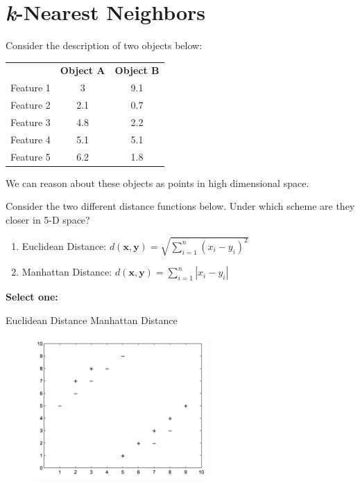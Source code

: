 \documentclass[11pt,addpoints,answers]{exam}
\numberwithin{equation}{section} %
\numberwithin{figure}{section} %
\numberwithin{table}{section} %
\newcommand{\xv}{\mathbf{x}}
\newcommand{\yv}{\mathbf{y}}
\begin{document}
\newpage
\section{{\it k}-Nearest Neighbors}


\begin{questions}
    \question[3] Consider the description of two objects below:
    
    \begin{table}[H]
        \centering
        \begin{tabular}{c c c}
             & \textbf{Object A} & \textbf{Object B} \\
            Feature 1 & 3 & 9.1 \\
            Feature 2 & 2.1 & 0.7 \\
            Feature 3 & 4.8 & 2.2 \\
            Feature 4 & 5.1 & 5.1 \\
            Feature 5 & 6.2 & 1.8 
        \end{tabular}
    \end{table}
    We can reason about these objects as points in high dimensional space.
    
    Consider the two different distance functions below. Under which scheme are they closer in 5-D space?
    \begin{enumerate}
        \item Euclidean Distance: $d(\xv, \yv) = \sqrt{\sum_{i=1}^n (x_i - y_i)^2}$
        \item Manhattan Distance: $d(\xv, \yv) = \sum_{i=1}^n |x_i - y_i|$
    \end{enumerate}
    
    \textbf{Select one:}
    \begin{checkboxes}
        \CorrectChoice Euclidean Distance
        \choice Manhattan Distance
    \end{checkboxes}

    
    
    \begin{figure}[H]
        \centering
        \includegraphics[width = 0.6\textwidth]{Q2_knn.png}
        \label{Q2_knn}
    \end{figure}


\end{questions}
\end{document}
